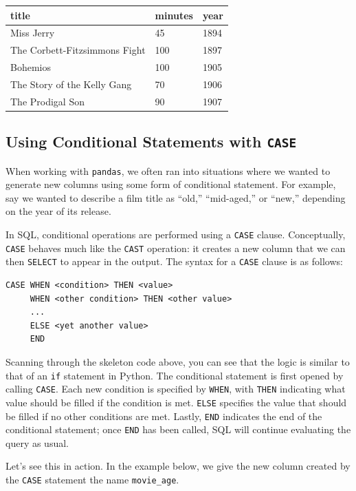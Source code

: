 \documentclass[
  letterpaper,
  DIV=11,
  numbers=noendperiod]{scrreprt}
\begin{document}
\begin{longtable}[]{@{}lll@{}}
\toprule\noalign{}
title & minutes & year \\
\midrule\noalign{}
\endhead
\bottomrule\noalign{}
\endlastfoot
Miss Jerry & 45 & 1894 \\
The Corbett-Fitzsimmons Fight & 100 & 1897 \\
Bohemios & 100 & 1905 \\
The Story of the Kelly Gang & 70 & 1906 \\
The Prodigal Son & 90 & 1907 \\
\end{longtable}

\subsection{\texorpdfstring{Using Conditional Statements with
\texttt{CASE}}{Using Conditional Statements with CASE}}\label{using-conditional-statements-with-case}

When working with \texttt{pandas}, we often ran into situations where we
wanted to generate new columns using some form of conditional statement.
For example, say we wanted to describe a film title as ``old,''
``mid-aged,'' or ``new,'' depending on the year of its release.

In SQL, conditional operations are performed using a \texttt{CASE}
clause. Conceptually, \texttt{CASE} behaves much like the \texttt{CAST}
operation: it creates a new column that we can then \texttt{SELECT} to
appear in the output. The syntax for a \texttt{CASE} clause is as
follows:

\begin{verbatim}
CASE WHEN <condition> THEN <value>
     WHEN <other condition> THEN <other value>
     ...
     ELSE <yet another value>
     END
\end{verbatim}

Scanning through the skeleton code above, you can see that the logic is
similar to that of an \texttt{if} statement in Python. The conditional
statement is first opened by calling \texttt{CASE}. Each new condition
is specified by \texttt{WHEN}, with \texttt{THEN} indicating what value
should be filled if the condition is met. \texttt{ELSE} specifies the
value that should be filled if no other conditions are met. Lastly,
\texttt{END} indicates the end of the conditional statement; once
\texttt{END} has been called, SQL will continue evaluating the query as
usual.

Let's see this in action. In the example below, we give the new column
created by the \texttt{CASE} statement the name \texttt{movie\_age}.
\end{document}
